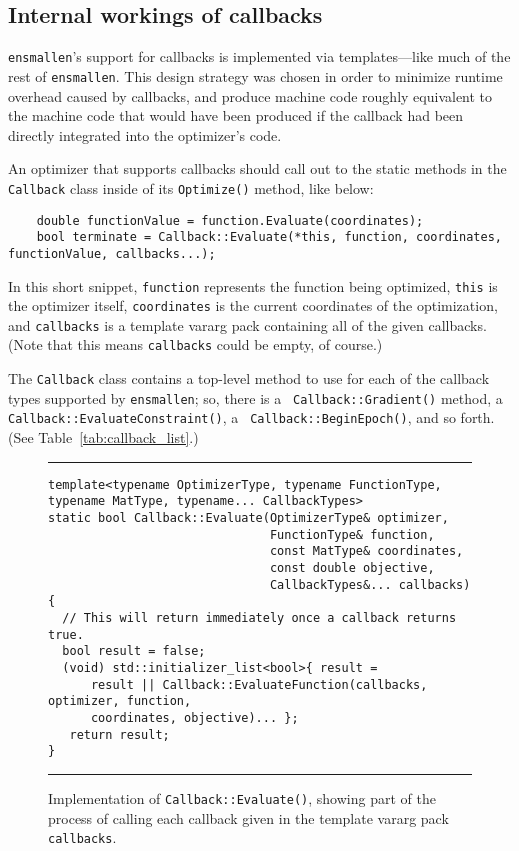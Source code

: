 \subsection{Internal workings of callbacks}

{\tt ensmallen}'s support for callbacks is implemented via templates---like much
of the rest of {\tt ensmallen}.  This design strategy was chosen in order to
minimize runtime overhead caused by callbacks, and produce machine code roughly
equivalent to the machine code that would have been produced if the callback had
been directly integrated into the optimizer's code.

An optimizer that supports callbacks should call out to the static methods in
the {\tt Callback} class inside of its {\tt Optimize()} method, like below:

\begin{verbatim}
    double functionValue = function.Evaluate(coordinates);
    bool terminate = Callback::Evaluate(*this, function, coordinates, functionValue, callbacks...);
\end{verbatim}

In this short snippet, {\tt function} represents the function being optimized,
{\tt *this} is the optimizer itself, {\tt coordinates} is the current
coordinates of the optimization, and {\tt callbacks} is a template vararg pack
containing all of the given callbacks.  (Note that this means {\tt callbacks}
could be empty, of course.)

The {\tt Callback} class contains a top-level method to use for each of the
callback types supported by {\tt ensmallen}; so, there is a {\tt
Callback::Gradient()} method, a {\tt Callback::EvaluateConstraint()}, a {\tt
Callback::BeginEpoch()}, and so forth.  (See Table~\ref{tab:callback_list}.)

\begin{figure}[b!]
\hrule
\vspace{1ex}
\begin{verbatim}
template<typename OptimizerType, typename FunctionType, typename MatType, typename... CallbackTypes>
static bool Callback::Evaluate(OptimizerType& optimizer,
                               FunctionType& function,
                               const MatType& coordinates,
                               const double objective,
                               CallbackTypes&... callbacks)
{
  // This will return immediately once a callback returns true.
  bool result = false;
  (void) std::initializer_list<bool>{ result =
      result || Callback::EvaluateFunction(callbacks, optimizer, function,
      coordinates, objective)... };
   return result;
}
\end{verbatim}
\hrule
\vspace*{-0.5em}
\caption{Implementation of {\tt Callback::Evaluate()}, showing part of the
process of calling each callback given in the template vararg pack {\tt
callbacks}.}
\label{fig:callback_evaluate}
\end{figure}

